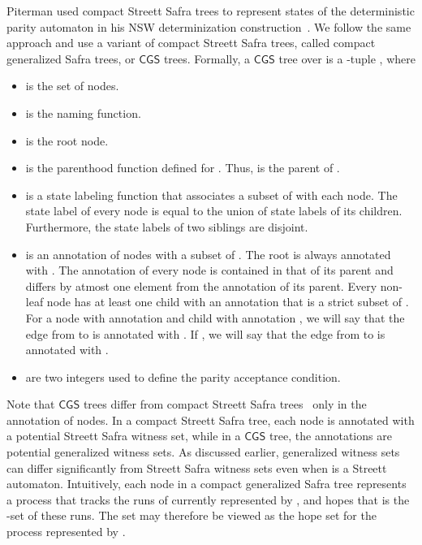\documentclass[3p]{elsarticle}
\newcommand{\CGS}{\ensuremath{\textsf{CGS }}}
\begin{document}
Piterman used compact Streett Safra trees to represent states of the
deterministic parity automaton in his NSW determinization
construction~\cite{piterman}.  We follow the same approach and use a
variant of compact Streett Safra trees, called compact generalized
Safra trees, or \CGS trees.  Formally, a \CGS tree  over  is a -tuple , where
\begin{itemize}

\item   is the set of nodes.

\item  is the naming function.

\item  is the root node.

\item  is the parenthood function defined for .  Thus,  is the parent of .


\item  is a state labeling function that
  associates a subset of  with each node.  The state label of every
  node is equal to the union of state labels of its
  children. Furthermore, the state labels of two siblings are
  disjoint.

\item  is an annotation of nodes with a
  subset of .  The root is always annotated with . The
  annotation of every node is contained in that of its parent and
  differs by atmost one element from the annotation of its parent. Every
  non-leaf node  has at least one child with an annotation that is
  a strict subset of .  For a node  with annotation  and
  child  with annotation , we will say
  that the edge from  to  is annotated with .  If ,
  we will say that the edge from  to  is annotated with .

\item  are two integers used to define the
  parity acceptance condition.
\end{itemize}
Note that \CGS trees differ from compact Streett Safra
trees~\cite{piterman} only in the annotation of nodes.  In a compact
Streett Safra tree, each node is annotated with a potential Streett
Safra witness set, while in a \CGS tree, the annotations are potential
generalized witness sets.  As discussed earlier, generalized witness
sets can differ significantly from Streett Safra witness sets even
when  is a Streett automaton.  Intuitively, each node  in a
compact generalized Safra tree represents a process that tracks the
runs of  currently represented by , and hopes that
 is the -set of these runs.  The set  may
therefore be viewed as the hope set for the process represented by
.
\end{document}
